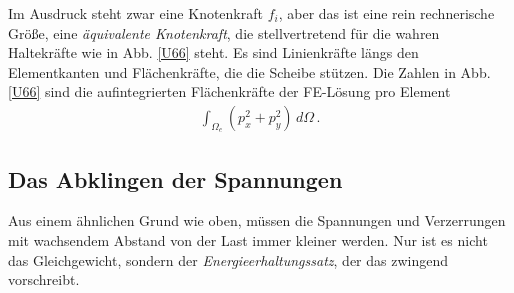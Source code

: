 Im Ausdruck steht zwar eine Knotenkraft $f_i$, aber das ist eine rein rechnerische Gr\"{o}{\ss}e, eine {\em \"{a}quivalente Knotenkraft\/}, die stellvertretend f\"{u}r die wahren Haltekr\"{a}fte wie in Abb. \ref{U66} steht. Es sind Linienkr\"{a}fte l\"{a}ngs den Elementkanten und Fl\"{a}chenkr\"{a}fte, die die Scheibe st\"{u}tzen. Die Zahlen in Abb. \ref{U66} sind die aufintegrierten Fl\"{a}chenkr\"{a}fte der FE-L\"{o}sung pro Element
\begin{align}\label{Eq63}
\int_{\Omega_e} (p_x^2 + p_y^2)\,d\Omega\,.
\end{align}

\vspace{-0.5cm}
{\textcolor{sectionTitleBlue}{\section{Das Abklingen der Spannungen}}}
Aus einem \"{a}hnlichen Grund wie oben, m\"{u}ssen die Spannungen und Verzerrungen mit wachsendem Abstand von der Last immer kleiner werden. Nur ist es  nicht das Gleichgewicht, sondern der {\em Energieerhaltungssatz\/}, der das zwingend vorschreibt.

